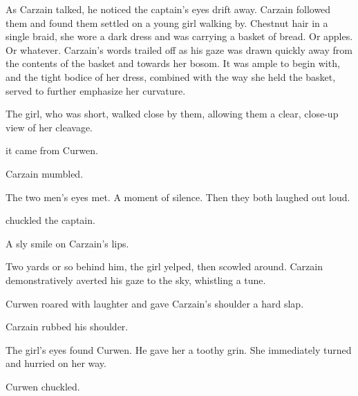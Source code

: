 






As Carzain talked, he noticed the captain's eyes drift away. 
Carzain followed them and found them settled on a young girl walking by. 
Chestnut hair in a single braid, she wore a dark dress and was carrying a basket of bread. Or apples. Or whatever. Carzain's words trailed off as his gaze was drawn quickly away from the contents of the basket and towards her bosom. It was ample to begin with, and the tight bodice of her dress, combined with the way she held the basket, served to further emphasize her curvature. 

The girl, who was short, walked close by them, allowing them a clear, close-up view of her cleavage. 

 it came from Curwen. 

 Carzain mumbled. 

The two men's eyes met. 
A moment of silence. 
Then they both laughed out loud. 

 chuckled the captain. 

A sly smile on Carzain's lips. 

Two yards or so behind him, the girl yelped, then scowled around. 
Carzain demonstratively averted his gaze to the sky, whistling a tune. 

Curwen roared with laughter and gave Carzain's shoulder a hard slap. 

 Carzain rubbed his shoulder. 

The girl's eyes found Curwen. 
He gave her a toothy grin. 
She immediately turned and hurried on her way. 

 Curwen chuckled. 







